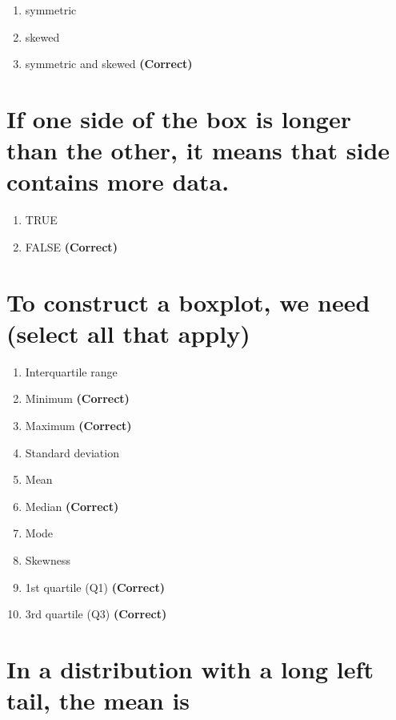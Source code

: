 \documentclass[letterpaper,10pt,twoside,printwatermark=false]{pinp}
\providecommand{\tightlist}{%
  \setlength{\itemsep}{0pt}\setlength{\parskip}{0pt}}
\begin{document}
\begin{enumerate}
\def\labelenumi{\arabic{enumi}.}
\tightlist
\item
  symmetric
\item
  skewed
\item
  symmetric and skewed \textbf{(Correct)}
\end{enumerate}

\section{If one side of the box is longer than the other, it means that
side contains more
data.}\label{if-one-side-of-the-box-is-longer-than-the-other-it-means-that-side-contains-more-data.}

\begin{enumerate}
\def\labelenumi{\arabic{enumi}.}
\tightlist
\item
  TRUE
\item
  FALSE \textbf{(Correct)}
\end{enumerate}

\section{To construct a boxplot, we need (select all that
apply)}\label{to-construct-a-boxplot-we-need-select-all-that-apply}

\begin{enumerate}
\def\labelenumi{\arabic{enumi}.}
\tightlist
\item
  Interquartile range
\item
  Minimum \textbf{(Correct)}
\item
  Maximum \textbf{(Correct)}
\item
  Standard deviation
\item
  Mean
\item
  Median \textbf{(Correct)}
\item
  Mode
\item
  Skewness
\item
  1st quartile (Q1) \textbf{(Correct)}
\item
  3rd quartile (Q3) \textbf{(Correct)}
\end{enumerate}

\section{In a distribution with a long left tail, the mean
is}\label{in-a-distribution-with-a-long-left-tail-the-mean-is}
\end{document}
